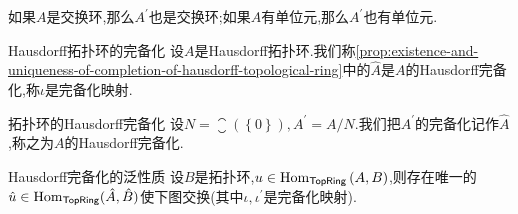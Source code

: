 \begin{remark}{}{}
	如果$A$是交换环,那么$A^{\prime}$也是交换环;如果$A$有单位元,那么$A^{\prime}$也有单位元.
\end{remark}

\begin{definition}{Hausdorff拓扑环的完备化}{}
	设$A$是Hausdorff拓扑环.我们称\cref{prop:existence-and-uniqueness-of-completion-of-hausdorff-topological-ring}中的$\hat{A}$是$A$的Hausdorff完备化,称$\iota$是完备化映射.
\end{definition}

\begin{definition}{拓扑环的Hausdorff完备化}{}
	设$N=\closure\left(\left\{0\right\}\right),A^{\prime}=A/N$.我们把$A^{\prime}$的完备化记作$\hat{A}$,称之为$A$的Hausdorff完备化.
\end{definition}

\begin{proposition}{Hausdorff完备化的泛性质}{}
	设$B$是拓扑环,$u\in\operatorname{Hom}_{\mathsf{TopRing}}\left(A,B\right)$,则存在唯一的$\hat{u}\in\operatorname{Hom}_{\mathsf{TopRing}}(\hat{A},\hat{B})$使下图交换(其中$\iota,\iota^{\prime}$是完备化映射).
	\begin{center}
	\end{center}
\end{proposition}
